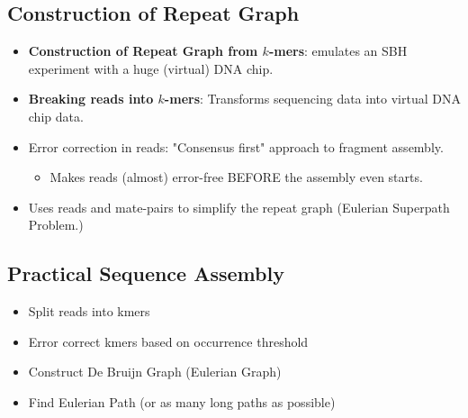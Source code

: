 \documentclass[10pt]{article}
\begin{document}
\subsection*{Construction of Repeat Graph}
\begin{itemize}
    \item \textbf{Construction of Repeat Graph from $k$-mers}: emulates an SBH experiment with a huge (virtual) DNA chip.
    \item \textbf{Breaking reads into $k$-mers}: Transforms sequencing data into virtual DNA chip data.
    \item Error correction in reads: "Consensus first" approach to fragment assembly.
    \begin{itemize}
        \item Makes reads (almost) error-free BEFORE the assembly even starts.
    \end{itemize}
    \item Uses reads and mate-pairs to simplify the repeat graph (Eulerian Superpath Problem.)
\end{itemize}

\subsection*{Practical Sequence Assembly}
\begin{itemize}
    \item Split reads into kmers
    \item Error correct kmers based on occurrence threshold
    \item Construct De Bruijn Graph (Eulerian Graph)
    \item Find Eulerian Path (or as many long paths as possible)
\end{itemize}
\end{document}
